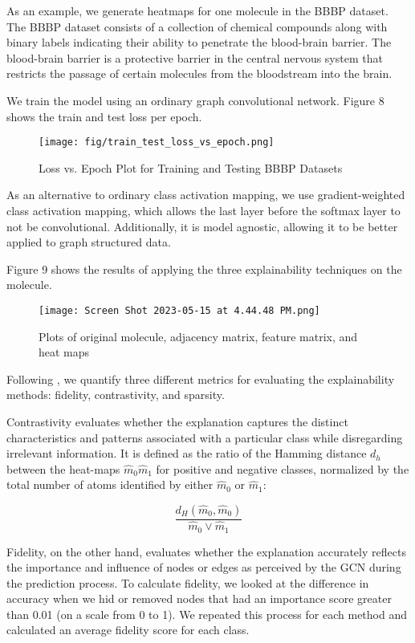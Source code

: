 \documentclass[final]{article}
\begin{document}
As an example, we generate heatmaps for one molecule in the BBBP dataset. The BBBP dataset consists of a collection of chemical compounds along with binary labels indicating their ability to penetrate the blood-brain barrier. The blood-brain barrier is a protective barrier in the central nervous system that restricts the passage of certain molecules from the bloodstream into the brain.

We train the model using an ordinary graph convolutional network. Figure 8 shows the train and test loss per epoch. 

\begin{figure}[!hbt]
  \centering
 \texttt{[image: fig/train\_test\_loss\_vs\_epoch.png]}
  \caption{Loss vs. Epoch Plot for Training and Testing BBBP Datasets}
 \end{figure} 


As an alternative to ordinary class activation mapping, we use gradient-weighted class activation mapping, which allows the last layer before the softmax layer to not be convolutional. Additionally, it is model agnostic, allowing it to be better applied to graph structured data. \cite{9666067}


Figure 9 shows the results of applying the three explainability techniques on the molecule. 

\begin{figure}[!hbt]
  \centering
 \texttt{[image: Screen Shot 2023-05-15 at 4.44.48 PM.png]}
  \caption{Plots of original molecule, adjacency matrix, feature matrix, and heat maps}
 \end{figure} 
 \newpage

Following \cite{8954227}, we quantify three different metrics for evaluating the explainability methods: fidelity, contrastivity, and sparsity. 

Contrastivity evaluates whether the explanation captures the distinct characteristics and patterns associated with a particular class while disregarding irrelevant information. It is defined as the ratio of the Hamming distance
$d_h$ between the heat-maps $\hat{m}_0  \hat{m}_1$ for positive and
negative classes, normalized by the total number of atoms
identified by either $\hat{m}_0$ or $\hat{m}_1$: 

$$\frac{d_H(\hat{m}_0, \hat{m}_0)}{\hat{m}_0 \lor \hat{m}_1}$$

Fidelity, on the other hand, evaluates whether the explanation accurately reflects the importance and influence of nodes or edges as perceived by the GCN during the prediction process.  To calculate fidelity, we looked at the difference in accuracy when we hid or removed nodes that had an importance score greater than 0.01 (on a scale from 0 to 1). We repeated this process for each method and calculated an average fidelity score for each class.
\end{document}
